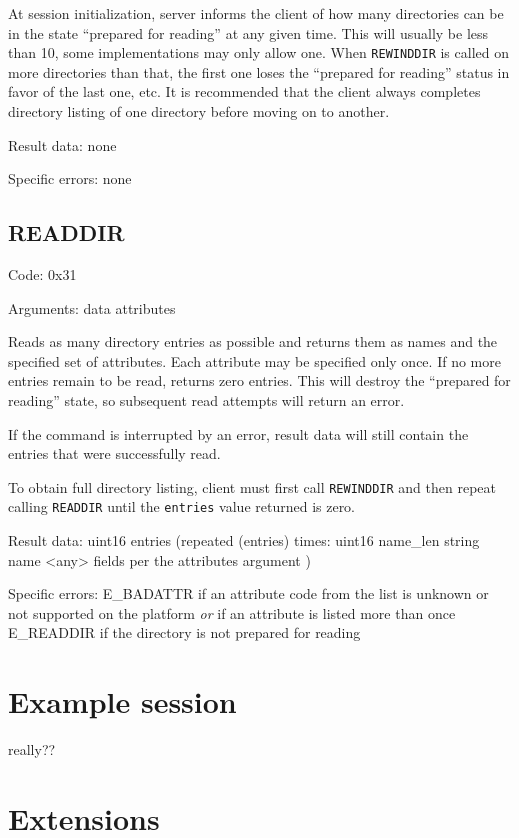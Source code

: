 At session initialization, server informs the client of how many directories can be in the state ``prepared
for reading'' at any given time. This will usually be less than 10, some implementations may only allow one.
When {\tt REWINDDIR} is called on more directories than that, the first one loses the ``prepared for reading''
status in favor of the last one, etc. It is recommended that the client always completes directory listing of
one directory before moving on to another.

Result data: none

Specific errors: none

\subsection{READDIR}

Code: 0x31

Arguments:
data attributes

Reads as many directory entries as possible and returns them as names and the specified set of attributes.
Each attribute may be specified only once. If no more entries remain to be read, returns zero entries. This
will destroy the ``prepared for reading'' state, so subsequent read attempts will return an error.

If the command is interrupted by an error, result data will still contain the entries that were successfully
read.

To obtain full directory listing, client must first call {\tt REWINDDIR} and then repeat calling {\tt READDIR}
until the {\tt entries} value returned is zero.

Result data:
uint16 entries
(repeated (entries) times:
	uint16 name\_len
	string name
	<any> fields per the attributes argument
)

Specific errors:
	E\_BADATTR if an attribute code from the list is unknown or not supported on the platform
		{\it or} if an attribute is listed more than once
	E\_READDIR if the directory is not prepared for reading


\section{Example session}

really??


\section{Extensions}

